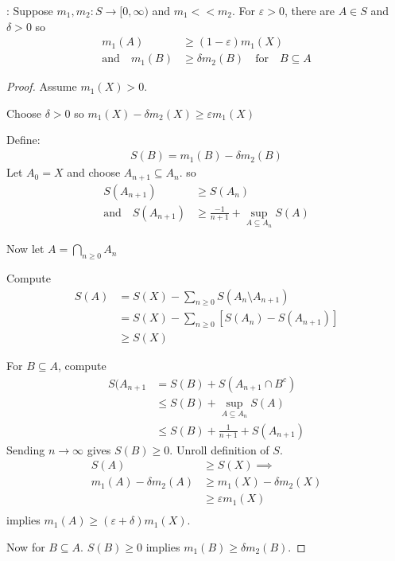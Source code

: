 \begin{theorem}
	\begin{lemma}: Suppose $m_1, m_2 : S \to [0, \infty)$ and $m_1 << m_2$.
		For $\varepsilon > 0$, there are $A \in S$ and $\delta > 0$ so 
		\begin{align*}
					m_1 (A) &\geq (1 - \varepsilon) m_1 (X) \\
			\text{and} \quad m_1 (B) &\geq \delta m_2 (B) \quad \text{for} \quad B \subseteq A
		\end{align*} 
	\end{lemma}
\end{theorem}


\begin{proof}
	Assume $m_1 (X) > 0$.

	Choose $\delta > 0$ so $m_1 (X) - \delta m_2 (X) \geq \varepsilon m_1 (X)$

	Define: 
	\begin{align*}
		S (B) = m_1 (B) - \delta m_2 (B)
	\end{align*} 
	Let $A_0 = X$ and choose  $A_{n+1} \subseteq A_{n}$. so
	\begin{align*}
		S( A_{n + 1} ) &\geq S (A_{n}) \\
		\text{and} \quad S(A_{n+1} ) &\geq \frac{-1}{n+1} + \sup_{A \subseteq A_{n}	} S (A)
	\end{align*} 

	Now let $A = \bigcap_{n \geq 0} A_n$

	Compute
	\begin{align*}
		S(A) &= S(X) - \sum_{n \geq 0} S( A_n \setminus A_{n+1} ) \\
			 &= S(X) - \sum_{n \geq 0} [S(A_{n}) - S(A_{n+1} ) ] \\
			 &\geq S(X)
	\end{align*} 

	For $B \subseteq A$, compute
	\begin{align*}
		S(A_{n + 1} &= S(B) + S(A_{n+1} \cap B^c ) \\
					&\leq S(B) + \sup_{A \subseteq A_{n}} S(A) \\
					&\leq S(B) + \frac{1}{n+1} + S(A_{n+1} )
	\end{align*} Sending $n \to \infty$ gives $S(B) \geq 0$. Unroll definition of $S$.
	\begin{align*}
		S(A) &\geq S(X) \implies \\
		m_1 (A) - \delta m_2 (A) &\geq m_1 (X) - \delta m_2 (X) \\
								 &\geq \varepsilon m_1 (X) \\
	\end{align*} implies $m_1 (A) \geq ( \varepsilon + \delta) m_1 (X)$.

	Now for $B \subseteq A$. $S(B) \geq 0$ implies $m_1 (B) \geq \delta m_2 (B)$.
\end{proof}


